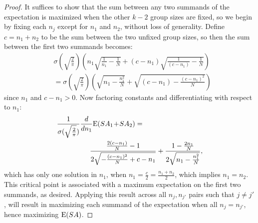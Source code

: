 \begin{proof}
It suffices to show that the sum between any two summands of the expectation is maximized when the other $k-2$ group sizes are fixed, so we begin by fixing each $n_j$ except for $n_1$ and $n_2$, without loss of generality. Define $c = n_1 + n_2$ to be the sum between the two unfixed group sizes, so then the sum between the first two summands becomes:
\begin{align*}
&\sigma(\sqrt{\frac{2}{\pi}})(n_1\sqrt{\frac{1}{n_1} - \frac{1}{N}} + (c-n_1)\sqrt{\frac{1}{(c-n_1)} - \frac{1}{N}}) \\
&=\sigma(\sqrt{\frac{2}{\pi}})(\sqrt{n_1 - \frac{n_1^2}{N}} + \sqrt{(c-n_1) - \frac{(c-n_1)^2}{N}})
\end{align*}
since $n_1$ and $c-n_1 > 0$. Now factoring constants and differentiating with respect to $n_1$:
\begin{align*}
\frac{1}{\sigma(\sqrt{\frac{2}{\pi}})}\frac{d}{dn_1}\text{E}(SA_1 \!+\! SA_2) =~~~~~~&\\
 \frac{\frac{2 (c-n_1)}{N}-1}{2 \sqrt{-\frac{(c-n_1)^2}{N}+c-n_1}}&+\frac{1-\frac{2 n_1}{N}}{2 \sqrt{n_1-\frac{n_1^2}{N}}},
\end{align*}
which has only one solution in $n_1$, when $n_1 = \frac{c}{2} =  \frac{n_1 + n_2}{2}$, which implies $n_1 = n_2$. This critical point is associated with a maximum expectation on the first two summands, as desired. Applying this result across all $n_j, n_{j'}$ pairs such that $j \neq j'$, will result in maximizing each summand of the expectation when all $n_j = n_{j'}$, hence maximizing $\text{E}(SA)$.
\end{proof}